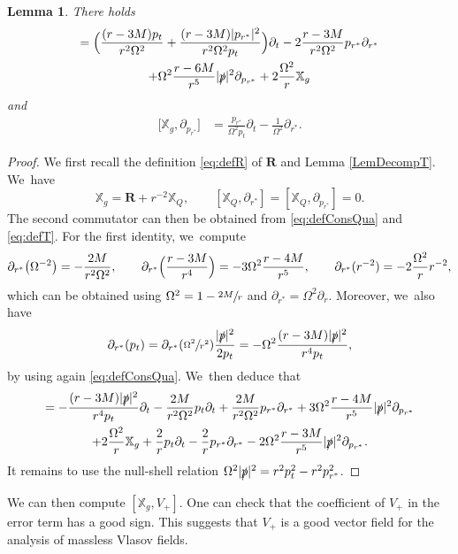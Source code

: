 \documentclass[10pt]{amsart}
\theoremstyle{plain}
\newtheorem{lemma}[proposition]{Lemma}
\theoremstyle{definition}
\newcommand\T{{\mathbb{X}}}
\begin{document}
\begin{lemma}\label{LemComdrdpr}
There holds
\begin{multline*}
[\T_g,\partial_{r^*}] = \Bigl(\frac{(r-3M)p_t}{r^2 \Omega^2}+\frac{(r-3M)|p_{r^*}|^2}{r^2 \Omega^2 p_t} \Bigr) \partial_t-2\frac{r-3M}{r^2 \Omega^2}p_{r^*} \partial_{r^*} \\
+ \Omega^2 \frac{r-6M}{r^5} |\slashed{p}|^2 \partial_{p_{r^*}}+2\frac{\Omega^2}{r}\T_g
\end{multline*}
and
\begin{align*}
\bigl[ \T_g, \partial_{p_{r^*}} \bigr] & = \frac{p_{r^*}}{ \Omega^2p_t} \partial_t- \frac{1}{\Omega^2} \partial_{r^*}.
\end{align*}
\end{lemma}

\begin{proof}
We first recall the definition \eqref{eq:defR} of $\pmb{R}$ and Lemma \ref{LemDecompT}. We~have
\[
\T_g = \pmb{R}+r^{-2} \T_Q,\qquad [\T_Q, \partial_{r^*}]=[\T_Q, \partial_{p_{r^*}}]=0.
\]
The second commutator can then be obtained from \eqref{eq:defConsQua} and \eqref{eq:defT}. For the first identity, we~compute
\[
\partial_{r^*} \bigl(\Omega^{-2} \bigr) = - \frac{2M}{r^2 \Omega^2}, \qquad \partial_{r^*} \Bigl(\frac{r-3M}{r^4} \Bigr) = -3 \Omega^2 \frac{r-4M}{r^5}, \qquad \partial_{r^*}(r^{-2})= -2 \frac{\Omega^2}{r}r^{-2},
\]
which can be obtained using $\Omega^2=1-\sfrac{2M}{r}$ and $\partial_{r^*} = \Omega^2 \partial_r$. Moreover, we~also have
\begin{equation}\label{preuvecompartialr}
\partial_{r^*} (p_t)= \partial_{r^*}(\sfrac{\Omega^2}{r^2}) \frac{|\slashed{p}|^2}{2p_t}= - \Omega^2 \frac{(r-3M)|\slashed{p}|^2}{r^4p_t},
\end{equation}
by using again \eqref{eq:defConsQua}. We~then deduce that
\begin{multline*}
[\T_g,\partial_{r^*}] = -\frac{(r-3M)|\slashed{p}|^2}{r^4p_t} \partial_t - \frac{2M}{r^2 \Omega^2}p_t \partial_t+ \frac{2M}{r^2 \Omega^2} p_{r^*} \partial_{r^*} +3 \Omega^2 \frac{r-4M}{r^5} |\slashed{p}|^2 \partial_{p_{r^*}} \\
+2\frac{\Omega^2}{r}\T_g+\frac{2}{r} p_t \partial_t-\frac{2}{r}p_{r^*} \partial_{r^*} -2\Omega^2 \frac{r-3M}{r^5}|\slashed{p}|^2 \partial_{p_{r^*}}.
\end{multline*}
It remains to use the null-shell relation $\Omega^2|\slashed{p}|^2=r^2p_t^2-r^2p_{r^*}^2$.
\end{proof}

We can then compute $[\T_g,V_+]$. One can check that the coefficient of $V_+$ in the error term has a good sign. This suggests that $V_+$ is a good vector field for the analysis of massless Vlasov fields.
\end{document}
